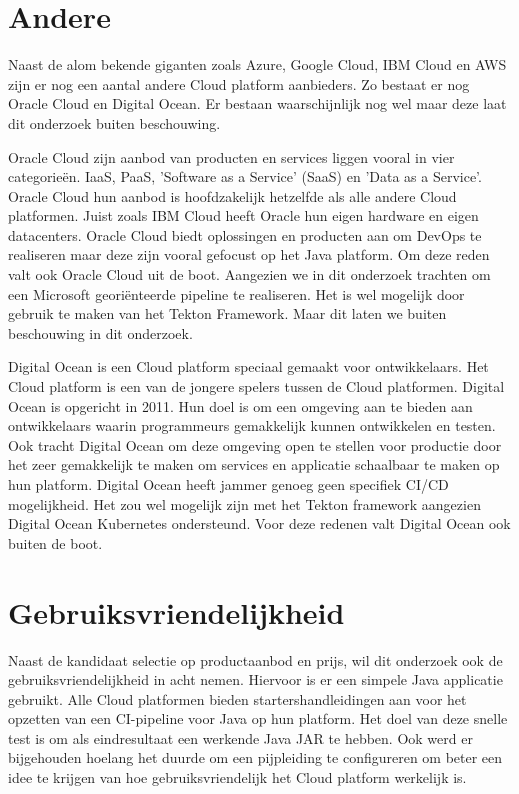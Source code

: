 \section{Andere}
\label{sec:oracledigitalocean}
Naast de alom bekende giganten zoals Azure, Google Cloud, IBM Cloud en AWS zijn er nog een aantal andere Cloud platform aanbieders. Zo bestaat er nog Oracle Cloud en Digital Ocean. Er bestaan waarschijnlijk nog wel maar deze laat dit onderzoek buiten beschouwing.

Oracle Cloud zijn aanbod van producten en services liggen vooral in vier categorieën. IaaS, PaaS, 'Software as a Service' (SaaS) en 'Data as a Service'. Oracle Cloud hun aanbod is hoofdzakelijk hetzelfde als alle andere Cloud platformen. Juist zoals IBM Cloud heeft Oracle hun eigen hardware en eigen datacenters. Oracle Cloud biedt oplossingen en producten aan om DevOps te realiseren maar deze zijn vooral gefocust op het Java platform. Om deze reden valt ook Oracle Cloud uit de boot. Aangezien we in dit onderzoek trachten om een Microsoft georiënteerde pipeline te realiseren. Het is wel mogelijk door gebruik te maken van het Tekton Framework. Maar dit laten we buiten beschouwing in dit onderzoek.

Digital Ocean is een Cloud platform speciaal gemaakt voor ontwikkelaars. Het Cloud platform is een van de jongere spelers tussen de Cloud platformen. Digital Ocean is opgericht in 2011. Hun doel is om een omgeving aan te bieden aan ontwikkelaars waarin programmeurs gemakkelijk kunnen ontwikkelen en testen. Ook tracht Digital Ocean om deze omgeving open te stellen voor productie door het zeer gemakkelijk te maken om services en applicatie schaalbaar te maken op hun platform. Digital Ocean heeft jammer genoeg geen specifiek CI/CD mogelijkheid. Het zou wel mogelijk zijn met het Tekton framework aangezien Digital Ocean Kubernetes ondersteund. Voor deze redenen valt Digital Ocean ook buiten de boot.

\section{Gebruiksvriendelijkheid}
\label{sec:KandidaatSelectie}
Naast de kandidaat selectie op productaanbod en prijs, wil dit onderzoek ook de gebruiksvriendelijkheid in acht nemen. Hiervoor is er een simpele Java applicatie gebruikt. Alle Cloud platformen bieden startershandleidingen aan voor het opzetten van een CI-pipeline voor Java op hun platform. Het doel van deze snelle test is om als eindresultaat een werkende Java JAR te hebben. Ook werd er bijgehouden hoelang het duurde om een pijpleiding te configureren om beter een idee te krijgen van hoe gebruiksvriendelijk het Cloud platform werkelijk is. 

